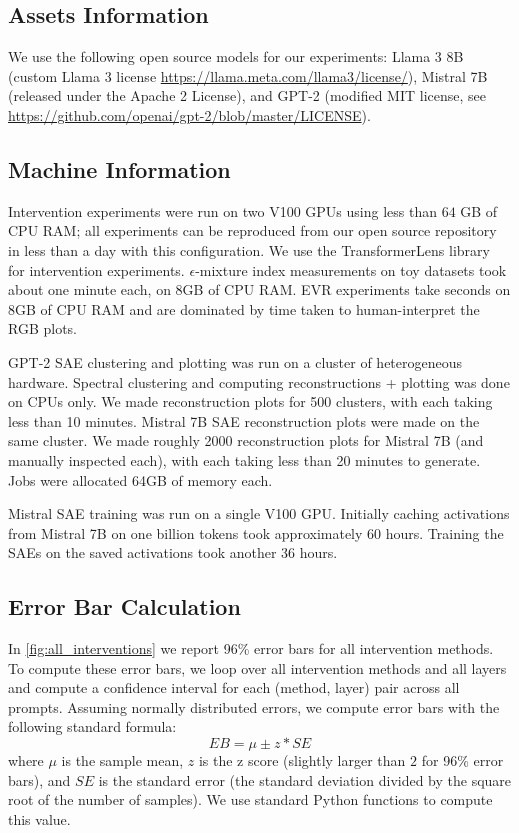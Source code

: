 \documentclass{article} %
\theoremstyle{plain}
\theoremstyle{definition}
\begin{document}
\subsection{Assets Information}
\label{sec:assets_info}
We use the following open source models for our experiments: Llama 3 8B \citep{llama3modelcard} (custom Llama 3 license \url{https://llama.meta.com/llama3/license/}), Mistral 7B \citep{mistral_7b} (released under the Apache 2 License), and GPT-2 \citep{gpt_2} (modified MIT license, see \url{https://github.com/openai/gpt-2/blob/master/LICENSE}).

\subsection{Machine Information}
\label{sec:machine_info}

Intervention experiments were run on two V100 GPUs using less than $64$ GB of CPU RAM; all experiments can be reproduced from our open source repository in less than a day with this configuration.  We use the TransformerLens library~\citep{nanda2022transformerlens} for intervention experiments. $\epsilon$-mixture index measurements on toy datasets took about one minute each, on 8GB of CPU RAM. EVR experiments take seconds on 8GB of CPU RAM and are dominated by time taken to human-interpret the RGB plots.

GPT-2 SAE clustering and plotting was run on a cluster of heterogeneous hardware. Spectral clustering and computing reconstructions + plotting was done on CPUs only. We made reconstruction plots for 500 clusters, with each taking less than 10 minutes. Mistral 7B SAE reconstruction plots were made on the same cluster. We made roughly 2000 reconstruction plots for Mistral 7B (and manually inspected each), with each taking less than 20 minutes to generate. Jobs were allocated 64GB of memory each.

Mistral SAE training was run on a single V100 GPU. Initially caching activations from Mistral 7B on one billion tokens took approximately 60 hours. Training the SAEs on the saved activations took another 36 hours.

\subsection{Error Bar Calculation}
\label{sec:ci_calculation}

In \cref{fig:all_interventions} we report 96\% error bars for all intervention methods. To compute these error bars, we loop over all intervention methods and all layers and compute a confidence interval for each (method, layer) pair across all prompts. Assuming normally distributed errors, we compute error bars with the following standard formula:
$$EB = \mu \pm z * SE$$
where $\mu$ is the sample mean, $z$ is the z score (slightly larger than $2$ for 96\% error bars), and $SE$ is the standard error (the standard deviation divided by the square root of the number of samples). We use standard Python functions to compute this value. 
\end{document}
